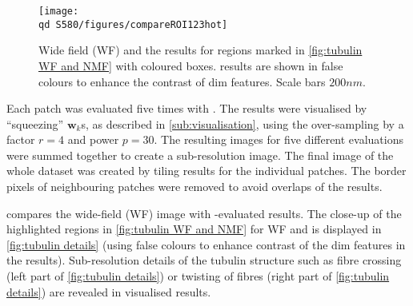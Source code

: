 \begin{figure}[!p]
	\centering
	\texttt{[image: \\qd S580/figures/compareROI123hot]}
	\caption{Wide field (WF) and the \inmf{} results for regions marked in \autoref{fig:tubulin WF and NMF} with coloured boxes. \inmf{} results are shown in false colours to enhance the contrast of dim features. Scale bars $200 \unit{nm}$.} 
	\label{fig:tubulin details}
\end{figure}
% 
Each patch was evaluated five times with \inmf{}. The results were visualised by ``squeezing'' $\bm{w}_k$s, as described in \autoref{sub:visualisation}, using the over-sampling by a factor $r=4$ and power $p=30$. The resulting images for five different \inmf{} evaluations were summed together to create a sub-resolution image. The final image of the whole dataset was created by tiling results for the individual patches. The border pixels of neighbouring patches were removed to avoid overlaps of the results.

 compares the wide-field (WF) image with \inmf{}-evaluated results. The close-up of the highlighted regions in \autoref{fig:tubulin WF and NMF}\aaa{} for WF and \inmf{} is displayed in \autoref{fig:tubulin details} (using false colours to enhance contrast of the dim features in the \inmf{} results). Sub-resolution details of the tubulin structure such as fibre crossing (left part of \autoref{fig:tubulin details}) or twisting of fibres (right part of \autoref{fig:tubulin details}) are revealed in visualised \inmf{} results.



